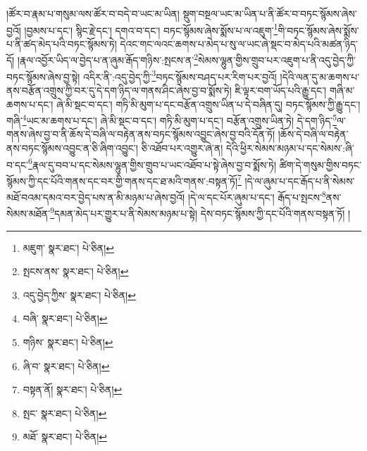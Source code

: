 །ཚོར་བ་རྣམ་པ་གསུམ་ལས་ཚོར་བ་བདེ་བ་ཡང་མ་ཡིན། སྡུག་བསྔལ་ཡང་མ་ཡིན་པ་ནི་ཚོར་བ་བཏང་སྙོམས་ཞེས་བྱའོ། །བྱམས་པ་དང་། སྙིང་རྗེ་དང་། དགའ་བ་དང་། བཏང་སྙོམས་ཞེས་སྨོས་པ་ལ་འཇུག་\footnote{མཇུག་  སྣར་ཐང་།  པེ་ཅིན། }གི་བཏང་སྙོམས་ཞེས་སྨོས་པ་ནི་ཚད་མེད་པའི་བཏང་སྙོམས་ཏེ། དེའང་གང་ལའང་ཆགས་པ་མེད་པ་སུ་ལ་ཡང་ཞེ་སྡང་བ་མེད་པའི་མཚན་ཉིད་དོ། །རྣལ་འབྱོར་ཡིད་ལ་བྱེད་པ་ན་ཞུམ་རྒོད་གཉིས་:སྤངས་ན་\footnote{སྤངས་ནས་  སྣར་ཐང་།  པེ་ཅིན། }སེམས་ལྷུན་གྱིས་གྲུབ་པར་འཇུག་པ་ནི་འདུ་བྱེད་ཀྱི་བཏང་སྙོམས་ཞེས་བྱ་སྟེ། འདིར་ནི་:འདུ་བྱེད་ཀྱི་\footnote{འདུ་བྱེད་ཀྱིས་  སྣར་ཐང་།  པེ་ཅིན། }བཏང་སྙོམས་བཤད་པར་རིག་པར་བྱའོ། །དེའི་ལན་དུ་མ་ཆགས་པ་ནས་བརྩོན་འགྲུས་ཀྱི་བར་དུ་དེ་དག་ཉིད་ལ་གནས་ཤིང་ཞེས་བྱ་བ་སྨོས་ཏེ། ཇི་ལྟར་བག་ཡོད་པའི་རྒྱུ་དང་། གཞི་མ་ཆགས་པ་དང་། ཞེ་མི་སྡང་བ་དང་། གཏི་མི་མུག་པ་དང་བརྩོན་འགྲུས་ཡིན་པ་དེ་བཞིན་དུ། བཏང་སྙོམས་ཀྱི་རྒྱུ་དང་། གཞི་\footnote{བཞི་  སྣར་ཐང་།  པེ་ཅིན། }ཡང་མ་ཆགས་པ་དང་། ཞེ་མི་སྡང་བ་དང་། གཏི་མི་མུག་པ་དང་། བརྩོན་འགྲུས་ཡིན་ཏེ། དེ་དག་ཉིད་\footnote{གཉིས་  སྣར་ཐང་།  པེ་ཅིན། }ལ་གནས་ཞེས་བྱ་བ་ནི་ཆོས་དེ་བཞི་ལ་བརྟེན་ནས་བཏང་སྙོམས་འབྱུང་ཞེས་བྱ་བའི་དོན་ཏོ། །ཆོས་དེ་བཞི་ལ་བརྟེན་ནས་བཏང་སྙོམས་འབྱུང་ན་ཅི་ཞིག་འབྱུང་། ཅི་འཐོབ་པར་འགྱུར་ཞེ་ན། དེའི་ཕྱིར་སེམས་མཉམ་པ་དང་སེམས་:ཞི་བ་དང་\footnote{ཞི་བ་  སྣར་ཐང་།  པེ་ཅིན། }རྣལ་དུ་བབ་པ་དང་སེམས་ལྷུན་གྱིས་གྲུབ་པ་ཡང་འཐོབ་པ་སྟེ་ཞེས་བྱ་བ་སྨོས་ཏེ། ཚིག་དེ་གསུམ་གྱིས་བཏང་སྙོམས་ཀྱི་དང་པོའི་གནས་དང་བར་གྱི་གནས་དང་ཐ་མའི་གནས་:བསྟན་ཏོ།\footnote{བསྟན་ནོ།  སྣར་ཐང་།  པེ་ཅིན། } །དེ་ལ་ཞུམ་པ་དང་རྒོད་པ་ནི་སེམས་མཐོ་བའམ་དམའ་བར་བྱེད་པས་ན་མི་མཉམ་པ་ཞེས་བྱའོ། །དེ་ལ་དང་པོར་ཞུམ་པ་དང་། རྒོད་པ་སྤངས་\footnote{སྤང་  སྣར་ཐང་།  པེ་ཅིན། }ནས་སེམས་མཐོན་\footnote{མཐོ་  སྣར་ཐང་།  པེ་ཅིན། }དམན་མེད་པར་གྱུར་པ་ནི་སེམས་མཉམ་པ་སྟེ། དེས་བཏང་སྙོམས་ཀྱི་དང་པོའི་གནས་བསྟན་ཏོ། །
